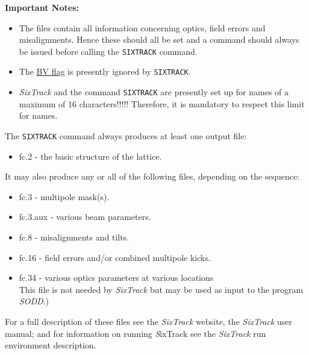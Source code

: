 {\bf Important Notes:}
\begin{itemize} 
\item The files contain all information concerning optics, field errors
 and misalignments. Hence these should all be set and a   
command should always be issued before calling the {\tt SIXTRACK} command.

\item The \hyperref[sec:bvflag]{BV flag} is presently ignored by {\tt SIXTRACK}.

\item \textit{SixTrack} and the \madx command {\tt SIXTRACK} are
  presently set up for names of a maximum of 16 characters!!!!! 
  Therefore, it is mandatory to respect this limit for \madx names.
\end{itemize}

The {\tt SIXTRACK} command always produces at least one output file: 
\begin{itemize}
   \item  fc.2 -  the basic structure of the lattice. 
\end{itemize} 
It may also produce any or all of the following files, depending on the
sequence:
\begin{itemize}
   \item  fc.3 -   multipole mask(s). 
   \item  fc.3.aux -  various beam parameters. 
   \item  fc.8 -   misalignments and tilts. 
   \item  fc.16 -  field errors and/or combined multipole kicks. 
   \item  fc.34 -  various optics parameters at various
     locations \\ This file is not needed by \textit{SixTrack} but may
     be used as input to the program \textit{SODD}\cite{SODD}.)   
\end{itemize}  

For a full description of these files see the \textit{SixTrack} website\cite{SixTrack_www}, the \textit{SixTrack} user manual\cite{SixTrack}; and for information on running {\textit SixTrack} 
see the \textit{SixTrack} run environment description\cite{SixTrack_RE}.

